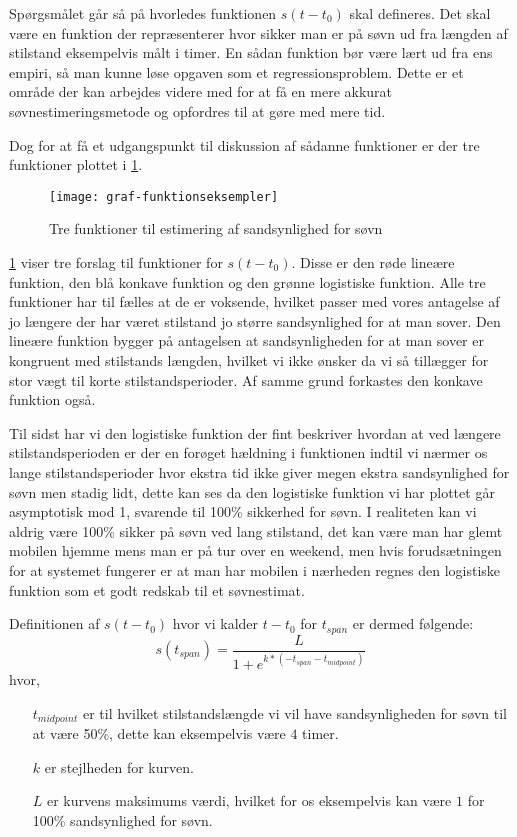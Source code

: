 Spørgsmålet går så på hvorledes funktionen $s(t-t_0)$ skal defineres.
Det skal være en funktion der repræsenterer hvor sikker man er på søvn ud fra længden af stilstand eksempelvis målt i timer.
En sådan funktion bør være lært ud fra ens empiri, så man kunne løse opgaven som et regressionsproblem.
Dette er et område der kan arbejdes videre med for at få en mere akkurat søvnestimeringsmetode og opfordres til at gøre med mere tid.

Dog for at få et udgangspunkt til diskussion af sådanne funktioner er der tre funktioner plottet i \cref{fig:trefunc}.
\begin{figure}[h]
	\centering
	\texttt{[image: graf-funktionseksempler]}
	\caption{Tre funktioner til estimering af sandsynlighed for søvn}\label{fig:trefunc}
\end{figure}

\cref{fig:trefunc} viser tre forslag til funktioner for $s(t-t_0)$.
Disse er den røde lineære funktion, den blå konkave funktion og den grønne logistiske funktion.
Alle tre funktioner har til fælles at de er voksende, hvilket passer med vores antagelse af jo længere der har været stilstand jo større sandsynlighed for at man sover.
Den lineære funktion bygger på antagelsen at sandsynligheden for at man sover er kongruent med stilstands længden, hvilket vi ikke ønsker da vi så tillægger for stor vægt til korte stilstandsperioder.
Af samme grund forkastes den konkave funktion også.

Til sidst har vi den logistiske funktion der fint beskriver hvordan at ved længere stilstandsperioden er der en forøget hældning i funktionen indtil vi nærmer os lange stilstandsperioder hvor ekstra tid ikke giver megen ekstra sandsynlighed for søvn men stadig lidt, dette kan ses da den logistiske funktion vi har plottet går asymptotisk mod 1, svarende til 100\% sikkerhed for søvn.
I realiteten kan vi aldrig være 100\% sikker på søvn ved lang stilstand, det kan være man har glemt mobilen hjemme mens man er på tur over en weekend, men hvis forudsætningen for at systemet fungerer er at man har mobilen i nærheden regnes den logistiske funktion som et godt redskab til et søvnestimat.

Definitionen af $s(t-t_0)$ hvor vi kalder $t-t_0$ for $t_{span}$ er dermed følgende:
\begin{equation}
	s(t_{span}) = \frac{L}{1+e^{k*(-t_{span} - t_{midpoint})}}
\end{equation} 
hvor,
\begin{itemize}
	\item[$t_{midpoint}$] er til hvilket stilstandslængde vi vil have sandsynligheden for søvn til at være 50\%, dette kan eksempelvis være $4$ timer.
	\item[$k$] er stejlheden for kurven.
	\item[$L$] er kurvens maksimums værdi, hvilket for os eksempelvis kan være $1$ for 100\% sandsynlighed for søvn.
\end{itemize}

